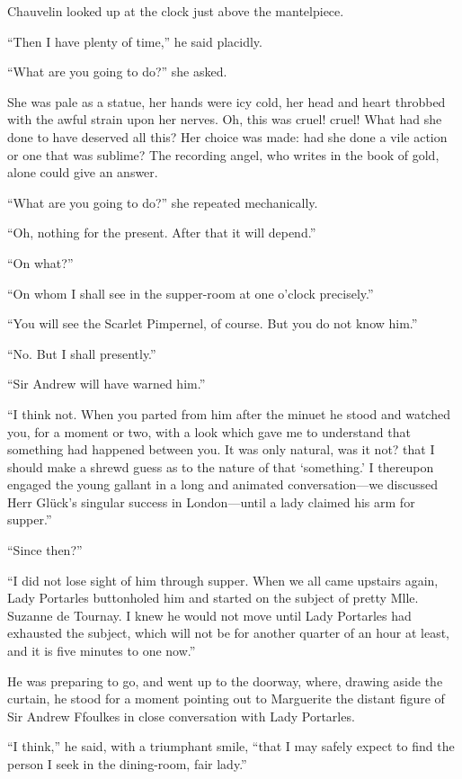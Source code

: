 \documentclass[paper=5.5in:8.5in,BCOR=7mm,twoside,DIV=calc,12pt,usegeometry,chapterprefix,endperiod,headings=big]{scrbook}
\begin{document}
Chauvelin looked up at the clock just above the mantelpiece.

\enquote{Then I have plenty of time,} he said placidly.

\enquote{What are you going to do?} she asked.

She was pale as a statue, her hands were icy cold, her head and heart throbbed with the awful strain upon her nerves. Oh, this was cruel! cruel! What had she done to have deserved all this? Her choice was made: had she done a vile action or one that was sublime? The recording angel, who writes in the book of gold, alone could give an answer.

\enquote{What are you going to do?} she repeated mechanically.

\enquote{Oh, nothing for the present. After that it will depend.}

\enquote{On what?}

\enquote{On whom I shall see in the supper-room at one o'clock precisely.}

\enquote{You will see the Scarlet Pimpernel, of course. But you do not know him.}

\enquote{No. But I shall presently.}

\enquote{Sir Andrew will have warned him.}

\enquote{I think not. When you parted from him after the minuet he stood and watched you, for a moment or two, with a look which gave me to understand that something had happened between you. It was only natural, was it not? that I should make a shrewd guess as to the nature of that \enquote{something.} I thereupon engaged the young gallant in a long and animated conversation---we discussed Herr Glück's singular success in London---until a lady claimed his arm for supper.}

\enquote{Since then?}

\enquote{I did not lose sight of him through supper. When we all came upstairs again, Lady Portarles buttonholed him and started on the subject of pretty Mlle. Suzanne de Tournay. I knew he would not move until Lady Portarles had exhausted the subject, which will not be for another quarter of an hour at least, and it is five minutes to one now.}

He was preparing to go, and went up to the doorway, where, drawing aside the curtain, he stood for a moment pointing out to Marguerite the distant figure of Sir Andrew Ffoulkes in close conversation with Lady Portarles.

\enquote{I think,} he said, with a triumphant smile, \enquote{that I may safely expect to find the person I seek in the dining-room, fair lady.}
\end{document}
